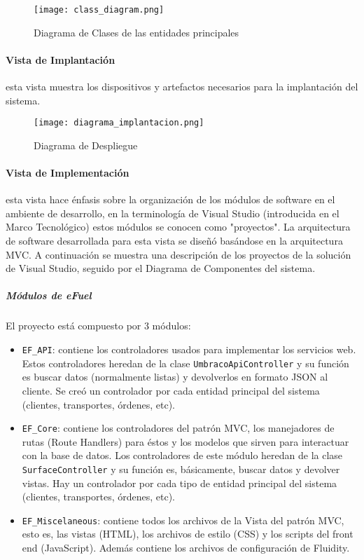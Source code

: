 \begin{figure}[H]
    \centering
    \texttt{[image: class\_diagram.png]}
    \caption{Diagrama de Clases de las entidades principales}
    \label{fig:class_diagram_main}
\end{figure}

\paragraph{Vista de Implantación} esta vista muestra los dispositivos y artefactos necesarios para la implantación del sistema.

\begin{figure}[H]
    \centering
    \texttt{[image: diagrama\_implantacion.png]}
    \caption{Diagrama de Despliegue}
    \label{fig:diagrama_implantacion}
\end{figure}

\paragraph{Vista de Implementación} esta vista hace énfasis sobre la organización de los módulos de software en el ambiente de desarrollo, en la terminología de Visual Studio (introducida en el Marco Tecnológico) estos módulos se conocen como "proyectos". La arquitectura de software desarrollada para esta vista se diseñó basándose en la arquitectura MVC. A continuación se muestra una descripción de los proyectos de la solución de Visual Studio, seguido por el Diagrama de Componentes del sistema.

\subparagraph*{Módulos de eFuel} El proyecto está compuesto por 3 módulos:
\begin{itemize}
    \item \texttt{EF\_API}: contiene los controladores usados para implementar los servicios web. Estos controladores heredan de la clase \texttt{UmbracoApiController} y su función es buscar datos (normalmente listas) y devolverlos en formato JSON al cliente. Se creó un controlador por cada entidad principal del sistema (clientes, transportes, órdenes, etc).
    \item \texttt{EF\_Core}: contiene los controladores del patrón MVC, los manejadores de rutas (Route Handlers) para éstos y los modelos que sirven para interactuar con la base de datos. Los controladores de este módulo heredan de la clase \texttt{SurfaceController} y su función es, básicamente, buscar datos y devolver vistas. Hay un controlador por cada tipo de entidad principal del sistema (clientes, transportes, órdenes, etc).
    \item \texttt{EF\_Miscelaneous}: contiene todos los archivos de la Vista del patrón MVC, esto es, las vistas (HTML), los archivos de estilo (CSS) y los scripts del front end (JavaScript). Además contiene los archivos de configuración de Fluidity.
\end{itemize}

